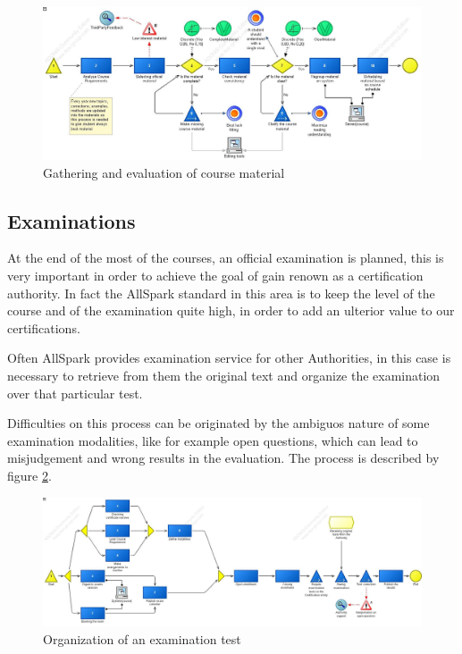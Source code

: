 \begin{figure}[!ht]
\centering
\includegraphics[scale=0.45, angle=90]{assign2/adonis/imgs/course_material.jpg}
\caption{Gathering and evaluation of course material}
\label{2img:course_material}
\end{figure}

\subsection{Examinations}
At the end of the most of the courses, an official examination is planned,
this is very important in order to achieve the goal of gain renown as a
certification authority. In fact the AllSpark standard in this area is to
keep the level of the course and of the examination quite high, in order to
add an ulterior value to our certifications.

Often AllSpark provides examination service for other Authorities, in this
case is necessary to retrieve from them the original text and organize the
examination over that particular test.

Difficulties on this process can be originated by the ambiguos nature of
some examination modalities, like for example open questions, which can
lead to misjudgement and wrong results in the evaluation.
The process is described by figure \ref{2img:examination}.

\begin{figure}[!ht]
\centering
\includegraphics[scale=0.35, angle=90]{assign2/adonis/imgs/examination.jpg}
\caption{Organization of an examination test}
\label{2img:examination}
\end{figure}

